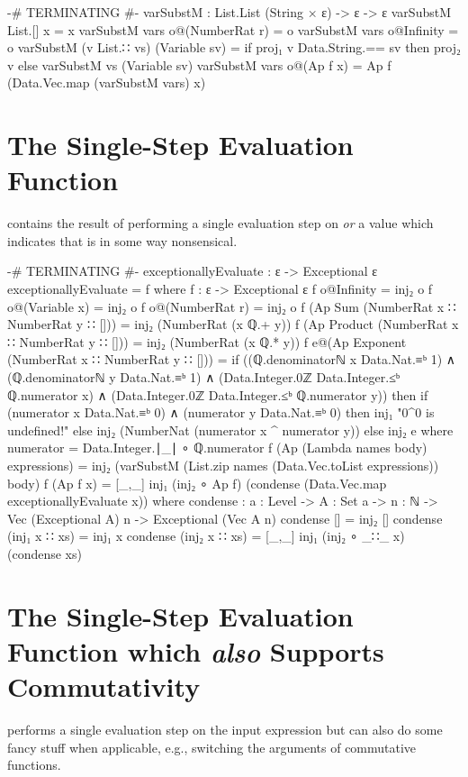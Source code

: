\documentclass{report}
\begin{document}
\begin{code}
{-# TERMINATING #-}
varSubstM : List.List (String × ε) -> ε -> ε
varSubstM List.[] x = x
varSubstM vars o@(NumberRat r) = o
varSubstM vars o@Infinity = o
varSubstM (v List.∷ vs) (Variable sv) =
  if proj₁ v Data.String.== sv
     then proj₂ v
     else varSubstM vs (Variable sv)
varSubstM vars o@(Ap f x) = Ap f (Data.Vec.map (varSubstM vars) x)
\end{code}

\section{The Single-Step Evaluation Function}
  contains the result of performing a single evaluation step on  \emph{or} a value which indicates that  is in some way nonsensical.

\begin{code}
{-# TERMINATING #-}
exceptionallyEvaluate : ε -> Exceptional ε
exceptionallyEvaluate = f
  where
  f : ε -> Exceptional ε
  f o@Infinity = inj₂ o
  f o@(Variable x) = inj₂ o
  f o@(NumberRat r) = inj₂ o
  f (Ap Sum (NumberRat x ∷ NumberRat y ∷ [])) =
    inj₂ (NumberRat (x ℚ.+ y))
  f (Ap Product (NumberRat x ∷ NumberRat y ∷ [])) =
    inj₂ (NumberRat (x ℚ.* y))
  f e@(Ap Exponent (NumberRat x ∷ NumberRat y ∷ [])) =
    if ((ℚ.denominatorℕ x Data.Nat.≡ᵇ 1) ∧
        (ℚ.denominatorℕ y Data.Nat.≡ᵇ 1) ∧
        (Data.Integer.0ℤ Data.Integer.≤ᵇ ℚ.numerator x) ∧
        (Data.Integer.0ℤ Data.Integer.≤ᵇ ℚ.numerator y))
       then if (numerator x Data.Nat.≡ᵇ 0) ∧
               (numerator y Data.Nat.≡ᵇ 0)
             then inj₁ "0^0 is undefined!"
             else inj₂ (NumberNat (numerator x ^ numerator y))
       else inj₂ e
       where numerator = Data.Integer.∣_∣ ∘ ℚ.numerator
  f (Ap (Lambda names body) expressions) =
    inj₂ (varSubstM (List.zip names (Data.Vec.toList expressions)) body)
  f (Ap f x) = [_,_] inj₁ (inj₂ ∘ Ap f) (condense (Data.Vec.map exceptionallyEvaluate x))
    where
    condense : {a : Level} ->
               {A : Set a} ->
               {n : ℕ} ->
               Vec (Exceptional A) n ->
               Exceptional (Vec A n)
    condense [] = inj₂ []
    condense (inj₁ x ∷ xs) = inj₁ x
    condense (inj₂ x ∷ xs) = [_,_] inj₁ (inj₂ ∘ _∷_ x) (condense xs)
\end{code}

\section{The Single-Step Evaluation Function which \emph{also} Supports Commutativity}
  performs a single evaluation step on the input expression but can also do some fancy stuff when applicable, e.g., switching the arguments of commutative functions.
\end{document}
